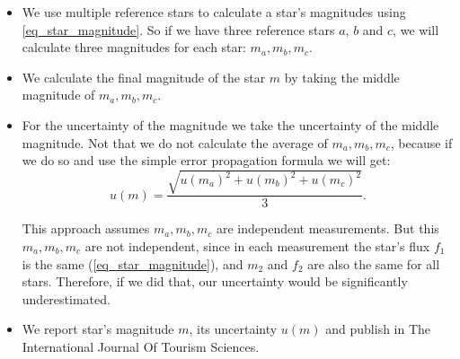 \begin{itemize}
   \item We use multiple reference stars to calculate a star's magnitudes using \autoref{eq_star_magnitude}. So if we have three reference stars $a$, $b$ and $c$, we will calculate three magnitudes for each star: $m_a, m_b, m_c$.
  
  \item We calculate the final magnitude of the star $m$ by taking the middle magnitude of $m_a, m_b, m_c$.
  
  
  \item For the uncertainty of the magnitude we take  the uncertainty of the middle magnitude. Not that we do not calculate the average of $m_a, m_b, m_c$, because if we do so and use the simple error propagation formula we will get:
  \[
  u(m) = \frac{\sqrt{u(m_a)^2 + u(m_b)^2 + u(m_c)^2}}{3}.
  \]
  
  This approach assumes $m_a, m_b, m_c$ are independent measurements. But this $m_a, m_b, m_c$  are not independent, since in each measurement the star's flux $f_1$ is the same (\autoref{eq_star_magnitude}), and $m_2$ and $f_2$ are also the same for all stars. Therefore, if we did that, our uncertainty would be significantly underestimated.
  
  \item We report star's magnitude $m$, its uncertainty $u(m)$ and publish in The International Journal Of Tourism Sciences.

\end{itemize}

